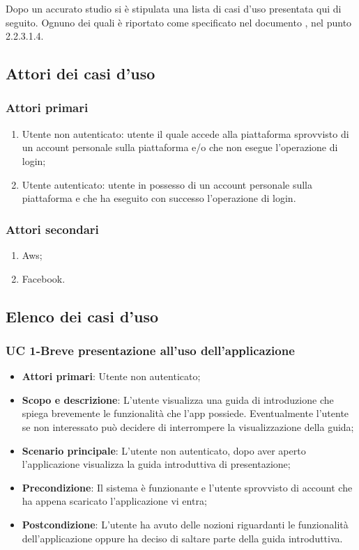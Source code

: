 Dopo un accurato studio si è stipulata una lista di casi d'uso presentata qui di seguito. Ognuno dei quali è riportato come specificato nel documento \NdP, nel punto 2.2.3.1.4.
\subsection{Attori dei casi d'uso}
\subsubsection{Attori primari}
  \begin{enumerate}
      \item Utente non autenticato: utente il quale accede alla piattaforma sprovvisto di un account personale sulla piattaforma e/o che non esegue l'operazione di login;
      \item Utente autenticato: utente in possesso di un account personale sulla piattaforma e che ha eseguito con successo l'operazione di login.
  \end{enumerate}
  
 \subsubsection{Attori secondari}
 \begin{enumerate}
     \item Aws;
     \item Facebook.
 \end{enumerate}
    
    
\subsection{Elenco dei casi d'uso}
   \subsubsection{UC 1-Breve presentazione all'uso dell'applicazione}
  
   
    \begin{itemize}
        \item \textbf{Attori primari}: Utente non autenticato;
        \item \textbf{Scopo e descrizione}: L'utente visualizza una guida di introduzione che spiega brevemente le funzionalità che l'app possiede. Eventualmente l'utente se non interessato può decidere di interrompere la visualizzazione della guida; 
        \item \textbf{Scenario principale}: L'utente non autenticato, dopo aver aperto l'applicazione visualizza la guida introduttiva di presentazione;
        \item \textbf{Precondizione}: Il sistema è funzionante e l'utente sprovvisto di account che ha appena scaricato l'applicazione vi entra;
        \item \textbf{Postcondizione}: L’utente ha  avuto delle nozioni riguardanti le funzionalità dell'applicazione oppure ha deciso di saltare parte della guida introduttiva.
    \end{itemize}
    
